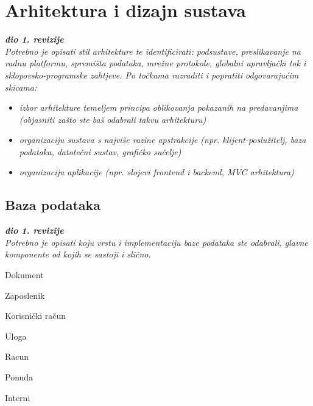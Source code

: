 \chapter{Arhitektura i dizajn sustava}
		
		\textbf{\textit{dio 1. revizije}}\\

		\textit{ Potrebno je opisati stil arhitekture te identificirati: podsustave, preslikavanje na radnu platformu, spremišta podataka, mrežne protokole, globalni upravljački tok i sklopovsko-programske zahtjeve. Po točkama razraditi i popratiti odgovarajućim skicama:}
	\begin{itemize}
		\item 	\textit{izbor arhitekture temeljem principa oblikovanja pokazanih na predavanjima (objasniti zašto ste baš odabrali takvu arhitekturu)}
		\item 	\textit{organizaciju sustava s najviše razine apstrakcije (npr. klijent-poslužitelj, baza podataka, datotečni sustav, grafičko sučelje)}
		\item 	\textit{organizaciju aplikacije (npr. slojevi frontend i backend, MVC arhitektura) }		
	\end{itemize}

	
		

		

				
		\section{Baza podataka}
			
			\textbf{\textit{dio 1. revizije}}\\
			
		\textit{Potrebno je opisati koju vrstu i implementaciju baze podataka ste odabrali, glavne komponente od kojih se sastoji i slično.}
		\newline
		\begin{packed_item}
			\item {Dokument}
			\item {Zaposlenik}
			\item {Korisnički račun}
			\item {Uloga}
			\item {Racun}
			\item {Ponuda}
			\item {Interni}
		\end{packed_item}
	
